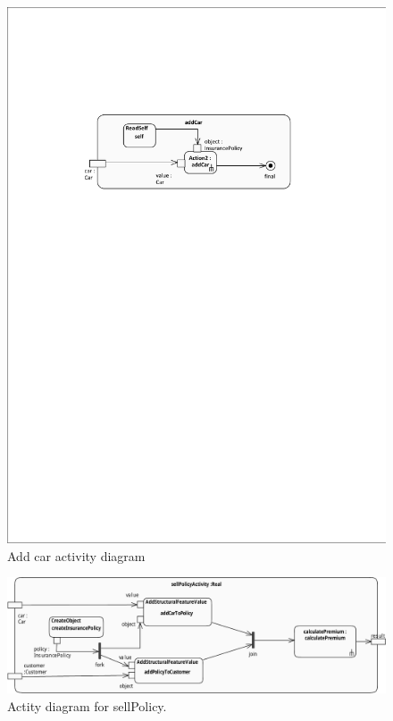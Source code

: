 \documentclass{llncs}
\begin{document}
\begin{figure}[ht]
 \centering
 \includegraphics{images/addCar-activity_diagram}
 \caption{Add car activity diagram}
 \label{fig:addCar}
\end{figure}

\begin{figure}[h!t]
 \centering
 \includegraphics[scale=0.6]{images/sellPolicy.pdf}
 \caption{Actity diagram for sellPolicy.}
 \label{fig:sellPolicy}
\end{figure}
\end{document}
